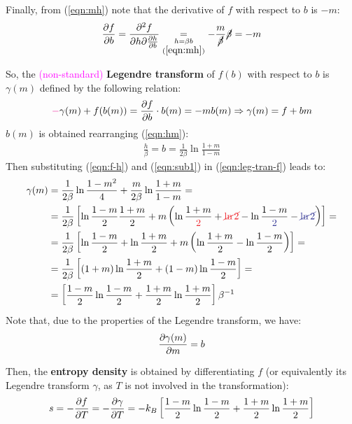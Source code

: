 \documentclass[../../main.tex]{subfiles}
\begin{document}
\begin{example}
    \medskip

    Finally, from (\ref{eqn:mh}) note that the derivative of $f$ with respect to $b$ is $-m$:
    \begin{align*}
        \pdv{f}{b} = \pdv{f}{h} {\pdv{h}{b}} \underset{\substack{h = \beta b\\(\ref{eqn:mh})}}{=} -\frac{m}{\cancel{\beta}} \cancel{\beta} = -m
    \end{align*}

    So, the \textcolor{Magenta}{(non-standard)} \textbf{Legendre transform} of $f(b)$ with respect to $b$ is $\gamma(m)$ defined by the following relation:
    \begin{align}\label{eqn:leg-tran-f}
        \textcolor{Magenta}{-} \gamma(m) + f(b(m)) = {\pdv{f}{b}}  \cdot b(m) = -mb(m) \Rightarrow \gamma(m) = f+ bm
    \end{align} 
    $b(m)$ is obtained rearranging (\ref{eqn:hm}):
    \begin{align}\label{eqn:sub1}
        \frac{h}{\beta} = b = \frac{1}{2\beta} \ln \frac{1+m}{1-m}   
    \end{align}
    Then substituting (\ref{eqn:f-h}) and (\ref{eqn:sub1}) in (\ref{eqn:leg-tran-f}) leads to:
    \begin{align*}
        \gamma(m) &= \frac{1}{2 \beta} \ln \frac{1-m^2}{4} + \frac{m}{2\beta}\ln \frac{1+m}{1-m} =\\
        &=\frac{1}{2\beta} \left[\ln \frac{1-m}{2} \frac{1+m}{2} + m\left(\ln \frac{1+m}{\textcolor{Red}{2}} +\textcolor{Red}{\cancel{\ln 2}} - \ln\frac{1-m}{\textcolor{Blue}{2}} -\textcolor{Blue}{\cancel{\ln 2}}   \right)    \right] =\\
        &= \frac{1}{2\beta} \left[\ln \frac{1-m}{2} + \ln \frac{1+m}{2} + m\left(\ln \frac{1+m}{2} - \ln \frac{1-m}{2}  \right)\right] =\\
        &= \frac{1}{2\beta} \left[(1+m)\ln\frac{1+m}{2} +(1-m) \ln \frac{1-m}{2}  \right] =\\
        &= \left[\frac{1-m}{2} \ln \frac{1-m}{2} +\frac{1+m}{2}\ln \frac{1+m}{2}    \right] \beta^{-1}
    \end{align*} 
    Note that, due to the properties of the Legendre transform, we have:
    \begin{align*}
        \pdv{\gamma(m)}{m} = b
    \end{align*}

    Then, the \textbf{entropy density} is obtained by differentiating $f$ (or equivalently its Legendre transform $\gamma$, as $T$ is not involved in the transformation):
    \begin{align}\label{eqn:s-density}
        s = -\pdv{f}{T} = -\pdv{\gamma}{T} = -k_B \left[\frac{1-m}{2} \ln \frac{1-m}{2} + \frac{1+m}{2} \ln \frac{1+m}{2} \right]
    \end{align} 


\end{example}
\end{document}
